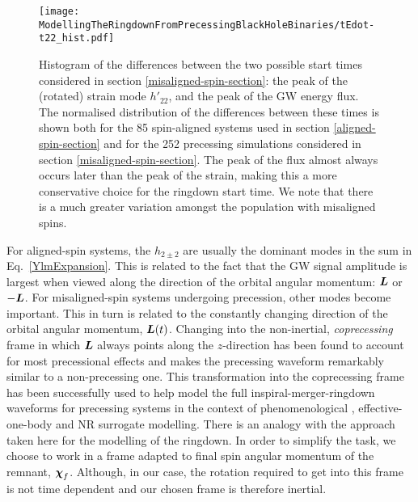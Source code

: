 \begin{figure}[b]
    \centering
    \texttt{[image: ModellingTheRingdownFromPrecessingBlackHoleBinaries/tEdot-t22\_hist.pdf]}
    \caption[Differences between the times of peak strain and peak GW energy flux]{  
    Histogram of the differences between the two possible start times considered in section \ref{misaligned-spin-section}: the peak of the (rotated) strain mode $h'_{22}$, and the peak of the GW energy flux.
    The normalised distribution of the differences between these times is shown both for the 85 spin-aligned systems used in section \ref{aligned-spin-section} and for the 252 precessing simulations considered in section \ref{misaligned-spin-section}. 
    The peak of the flux almost always occurs later than the peak of the strain, making this a more conservative choice for the ringdown start time. 
    We note that there is a much greater variation amongst the population with misaligned spins.
    }
	\label{tEdot-t22}
\end{figure}

For aligned-spin systems, the $h_{2\pm2}$ are usually the dominant modes in the sum in Eq.~\ref{YlmExpansion}. This is related to the fact that the GW signal amplitude is largest when viewed along the direction of the orbital angular momentum: $\vb*{L}$ or $-\vb*{L}$. For misaligned-spin systems undergoing precession, other modes become important. This in turn is related to the constantly changing direction of the orbital angular momentum, $\vb*{L}(t)$.
Changing into the non-inertial, \emph{coprecessing} frame in which $\vb*{L}$ always points along the $z$-direction has been found to account for most precessional effects and makes the precessing waveform remarkably similar to a non-precessing one.
This transformation into the coprecessing frame has been successfully used to help model the full inspiral-merger-ringdown waveforms for precessing systems \cite{2011PhRvD..84b4046S,2012PhRvD..86j4063S} in the context of phenomenological \cite{2014PhRvL.113o1101H, 2019PhRvD.100b4059K, 2020arXiv200406503P}, effective-one-body \cite{2014PhRvD..89h4006P, 2020PhRvD.102d4055O} and NR surrogate \cite{2017PhRvD..95j4023B, 2017PhRvD..96b4058B, 2019PhRvR...1c3015V} modelling.
There is an analogy with the approach taken here for the modelling of the ringdown. In order to simplify the task, we choose to work in a frame adapted to final spin angular momentum of the remnant, $\vb*{\chi}_f$.
Although, in our case, the rotation required to get into this frame is not time dependent and our chosen frame is therefore inertial.


